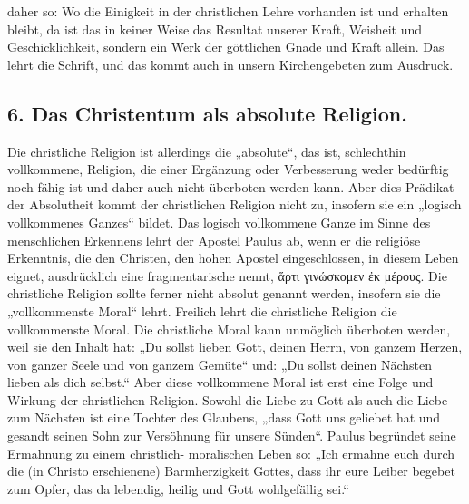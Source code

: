 daher so: Wo die Einigkeit in der christlichen Lehre vorhanden ist und erhalten bleibt, da ist das in keiner Weise das Resultat unserer Kraft, Weisheit und Geschicklichkeit, sondern ein Werk der göttlichen Gnade und Kraft allein. Das lehrt die Schrift, \footnotemark[127] und das kommt auch in unsern Kirchengebeten zum Ausdruck. \footnotemark[128]\subsection*{6. Das Christentum als absolute Religion.}Die christliche Religion ist allerdings die „absolute“, das ist, schlechthin vollkommene, Religion, die einer Ergänzung oder Verbesserung weder bedürftig noch fähig ist und daher auch nicht überboten werden kann. Aber dies Prädikat der Absolutheit kommt der christlichen Religion nicht zu, insofern sie ein „logisch vollkommenes Ganzes“ bildet. Das logisch vollkommene Ganze im Sinne des menschlichen Erkennens lehrt der Apostel Paulus ab, wenn er die religiöse Erkenntnis, die den Christen, den hohen Apostel eingeschlossen, in diesem Leben eignet, ausdrücklich eine fragmentarische nennt, \foreignlanguage{greek}{ἅρτι γινώσκομεν ἐκ μέρους}. \footnotemark[129] Die christliche Religion sollte ferner nicht absolut genannt werden, insofern sie die „vollkommenste Moral“ lehrt. Freilich lehrt die christliche Religion die vollkommenste Moral. Die christliche Moral kann unmöglich überboten werden, weil sie den Inhalt hat: „Du sollst lieben Gott, deinen Herrn, von ganzem Herzen, von ganzer Seele und von ganzem Gemüte“ und: „Du sollst deinen Nächsten lieben als dich selbst.“ \footnotemark[130] Aber diese vollkommene Moral ist erst eine Folge und Wirkung der christlichen Religion. Sowohl die Liebe zu Gott als auch die Liebe zum Nächsten ist eine Tochter des Glaubens, „dass Gott uns geliebet hat und gesandt seinen Sohn zur Versöhnung für unsere Sünden“. \footnotemark[131] Paulus begründet seine Ermahnung zu einem christlich- moralischen Leben so: „Ich ermahne euch durch die (in Christo erschienene) Barmherzigkeit Gottes, dass ihr eure Leiber begebet zum Opfer, das da lebendig, heilig und Gott wohlgefällig sei.“ \footnotemark[132]\setcounter{footnote}{126}